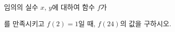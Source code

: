 임의의 실수 $x$, $y$에 대하여 함수 $f$가\par\smallskip{}\par\smallskip\noindent 를 만족시키고 $f(2)=1$일 때, $f(24)$의 값을 구하시오.
